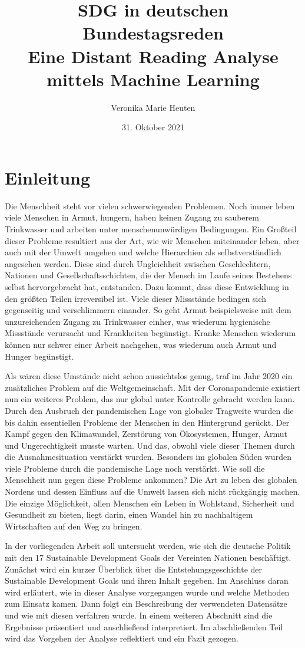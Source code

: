 \documentclass[a4paper,11pt]{article}
\title{SDG in deutschen Bundestagsreden\\[12pt] \large Eine Distant Reading
  Analyse mittels Machine Learning}
\author{Veronika Marie Heuten}
\date{31. Oktober 2021}
\begin{document}
\maketitle
\vfill
\thispagestyle{empty}
\tableofcontents
\clearpage

\section{Einleitung}
Die Menschheit steht vor vielen schwerwiegenden Problemen. Noch immer leben
viele Menschen in Armut, hungern, haben keinen Zugang zu sauberem Trinkwasser
und arbeiten unter menschenunwürdigen Bedingungen. Ein Großteil dieser
Probleme resultiert aus der Art, wie wir Menschen miteinander leben, aber auch
mit der Umwelt umgehen und welche Hierarchien als selbstverständlich angesehen
werden. Diese sind durch Ungleichheit zwischen Geschlechtern, Nationen und
Gesellschaftsschichten, die der Mensch im Laufe seines Bestehens selbst
hervorgebracht hat, entstanden. Dazu kommt, dass diese Entwicklung in den
größten Teilen irreversibel ist. Viele dieser Missstände bedingen sich
gegenseitig und verschlimmern einander. So geht Armut beispielsweise mit dem
unzureichenden Zugang zu Trinkwasser einher, was wiederum hygienische
Missstände verursacht und Krankheiten begünstigt. Kranke Menschen wiederum
können nur schwer einer Arbeit nachgehen, was wiederum auch Armut und Hunger
begünstigt.

Als wären diese Umstände nicht schon aussichtslos genug, traf im Jahr 2020 ein
zusätzliches Problem auf die Weltgemeinschaft. Mit der Coronapandemie
existiert nun ein weiteres Problem, das nur global unter Kontrolle gebracht
werden kann. Durch den Ausbruch der pandemischen Lage von globaler Tragweite
wurden die bis dahin essentiellen Probleme der Menschen in den Hintergrund
gerückt. Der Kampf gegen den Klimawandel, Zerstörung von Ökosystemen, Hunger,
Armut und Ungerechtigkeit musste warten. Und das, obwohl viele dieser Themen
durch die Ausnahmesituation verstärkt wurden. Besonders im globalen Süden
wurden viele Probleme durch die pandemische Lage noch verstärkt. Wie soll die
Menschheit nun gegen diese Probleme ankommen? Die Art zu leben des globalen
Nordens und dessen Einfluss auf die Umwelt lassen sich nicht rückgängig
machen.  Die einzige Möglichkeit, allen Menschen ein Leben in Wohlstand,
Sicherheit und Gesundheit zu bieten, liegt darin, einen Wandel hin zu
nachhaltigem Wirtschaften auf den Weg zu bringen.

In der vorliegenden Arbeit soll untersucht werden, wie sich die deutsche
Politik mit den 17 Sustainable Development Goals der Vereinten Nationen
beschäftigt. Zunächst wird ein kurzer Überblick über die Entstehungsgeschichte
der Sustainable Development Goals und ihren Inhalt gegeben. Im Anschluss daran
wird erläutert, wie in dieser Analyse vorgegangen wurde und welche Methoden
zum Einsatz kamen. Dann folgt ein Beschreibung der verwendeten Datensätze und
wie mit diesen verfahren wurde. In einem weiteren Abschnitt sind die
Ergebnisse präsentiert und anschließend interpretiert. Im abschließenden Teil
wird das Vorgehen der Analyse reflektiert und ein Fazit gezogen.
\end{document}
